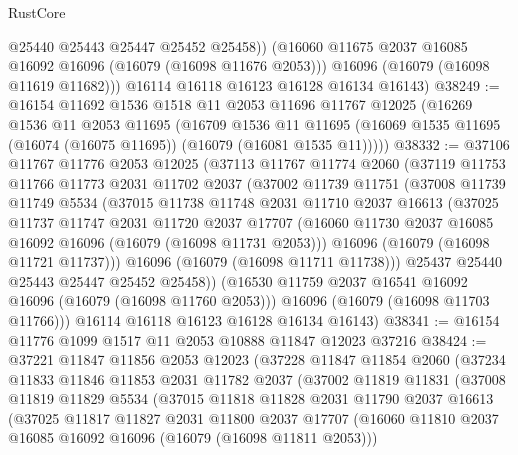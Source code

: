 \begin{lexlean}{RustCore}
\begin{coremodule}
            @25440
            @25443
            @25447
            @25452
            @25458))
        (@16060 @11675 @2037 @16085 @16092 @16096 (@16079 (@16098 @11676 @2053)))
        @16096
        (@16079 (@16098 @11619 @11682)))
      @16114
      @16118
      @16123
      @16128
      @16134
      @16143)
@38249 := @16154
    @11692
    @1536
    @1518
    @11
    @2053
    @11696
    @11767
    @12025
    (@16269
      @1536
      @11
      @2053
      @11695
      (@16709
        @1536
        @11
        @11695
        (@16069 @1535 @11695 (@16074 (@16075 @11695)) (@16079 (@16081 @1535 @11)))))
@38332 := @37106
    @11767
    @11776
    @2053
    @12025
    (@37113
      @11767
      @11774
      @2060
      (@37119
        @11753
        @11766
        @11773
        @2031
        @11702
        @2037
        (@37002
          @11739
          @11751
          (@37008
            @11739
            @11749
            @5534
            (@37015
              @11738
              @11748
              @2031
              @11710
              @2037
              @16613
              (@37025
                @11737
                @11747
                @2031
                @11720
                @2037
                @17707
                (@16060 @11730 @2037 @16085 @16092 @16096 (@16079 (@16098 @11731 @2053)))
                @16096
                (@16079 (@16098 @11721 @11737)))
              @16096
              (@16079 (@16098 @11711 @11738)))
            @25437
            @25440
            @25443
            @25447
            @25452
            @25458))
        (@16530 @11759 @2037 @16541 @16092 @16096 (@16079 (@16098 @11760 @2053)))
        @16096
        (@16079 (@16098 @11703 @11766)))
      @16114
      @16118
      @16123
      @16128
      @16134
      @16143)
@38341 := @16154 @11776 @1099 @1517 @11 @2053 @10888 @11847 @12023 @37216
@38424 := @37221
    @11847
    @11856
    @2053
    @12023
    (@37228
      @11847
      @11854
      @2060
      (@37234
        @11833
        @11846
        @11853
        @2031
        @11782
        @2037
        (@37002
          @11819
          @11831
          (@37008
            @11819
            @11829
            @5534
            (@37015
              @11818
              @11828
              @2031
              @11790
              @2037
              @16613
              (@37025
                @11817
                @11827
                @2031
                @11800
                @2037
                @17707
                (@16060 @11810 @2037 @16085 @16092 @16096 (@16079 (@16098 @11811 @2053)))

\end{coremodule}
\end{lexlean}
